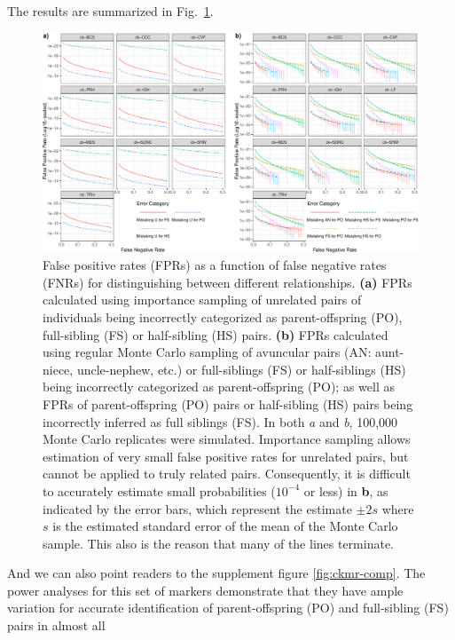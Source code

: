The results are summarized in Fig.~\ref{fig:fprs}.
\begin{figure}
\newcommand{\fprcap}{\footnotesize False positive rates (FPRs) as a function of false negative
rates (FNRs) for distinguishing between different relationships.  {\bf (a)} FPRs calculated
using importance sampling of unrelated pairs of individuals being incorrectly categorized as parent-offspring (PO),
full-sibling (FS) or half-sibling (HS) pairs.  {\bf (b)}  FPRs calculated using regular Monte Carlo
sampling of avuncular pairs (AN: aunt-niece, uncle-nephew, etc.) or full-siblings (FS) or half-siblings (HS) being
incorrectly categorized as parent-offspring (PO); as well as FPRs of parent-offspring (PO) pairs or half-sibling (HS)
pairs being incorrectly inferred as full siblings (FS).  In both {\em a} and {\em b}, 100,000 Monte Carlo replicates
were simulated.  Importance sampling allows estimation of very small false positive rates for unrelated pairs, but
cannot be applied to truly related pairs.  Consequently, it is difficult to accurately estimate small probabilities
($10^{-4}$ or less) in {\bf b}, as indicated by the error bars, which represent the estimate $\pm 2s$ where $s$
is the estimated standard error of the mean of the Monte Carlo sample.  This also is the reason that many of the lines terminate.   }
\begin{center}
\includegraphics[width=\textwidth]{images/fpr-fnr-figure-crop.pdf}
\end{center}
\caption[\fprcap]{\fprcap}
\label{fig:fprs}
\end{figure}
And we can also point readers to the supplement figure \ref{fig:ckmr-comp}.
The power analyses for this set of markers demonstrate that they have ample variation
for accurate identification of parent-offspring (PO) and full-sibling (FS) pairs in almost all
